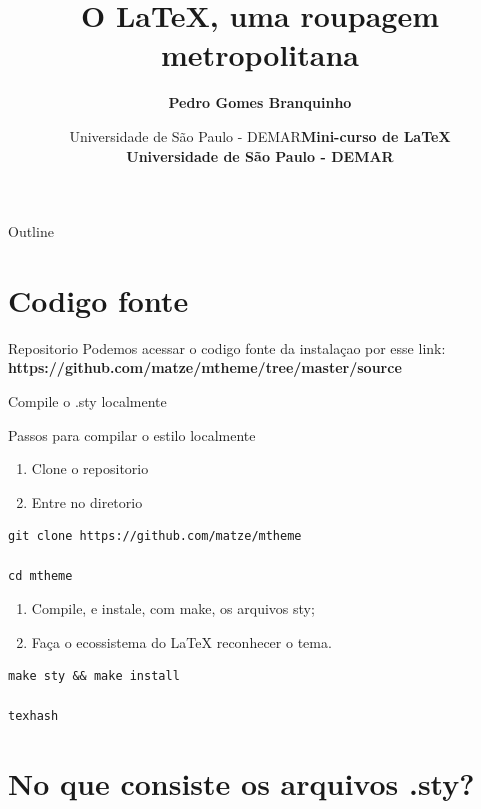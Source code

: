 \documentclass[bigger]{beamer}
\date{  Universidade de São Paulo - DEMAR}
\title{O \LaTeX{}, uma roupagem metropolitana}
\author[Branquinho]{\textbf{Pedro Gomes Branquinho \\ \text{\scriptsize{pedro.branquinho@usp.br}}}}
\date[EEL-USP]{\textbf{\scriptsize{Mini-curso de \LaTeX} \\ Universidade de São Paulo - DEMAR}}
\begin{document}
\maketitle
\begin{frame}{Outline}
\tableofcontents
\end{frame}

{

\section{Codigo fonte}
\label{sec:org0d36e7c}
\begin{frame}[label={sec:org594b747}]{Repositorio}
Podemos acessar o codigo fonte da instalaçao por esse link:
\textbf{https://github.com/matze/mtheme/tree/master/source}

\transdissolve
\end{frame}
\begin{frame}[label={sec:org273d7c6},fragile]{Compile o .sty localmente}
 \begin{block}{Passos para compilar o \alert{estilo} localmente}
\begin{enumerate}[<1->]
\item \small{Clone o repositorio}
\item \small{Entre no diretorio}
\end{enumerate}
\begin{verbatim}
git clone https://github.com/matze/mtheme

cd mtheme
\end{verbatim}

\begin{enumerate}[<2->]
\item \small Compile, e instale, com \alert{make}, os arquivos sty;
\item \small{Faça o ecossistema do LaTeX reconhecer o tema.}
\end{enumerate}
\begin{verbatim}
make sty && make install

texhash
\end{verbatim}
\end{block}
\end{frame}

\section{No que consiste os arquivos .sty?}
\label{sec:org48cbd82}

}
\end{document}
